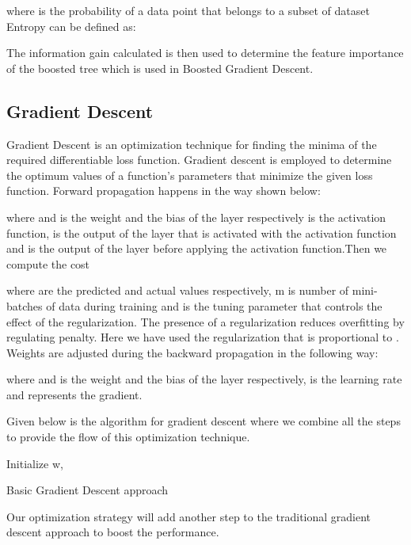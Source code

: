 \documentclass[review]{elsarticle}
\begin{document}
where  is the probability of a data point that belongs to a subset  of dataset 
Entropy can be defined as:

The information gain calculated is then used to determine the feature importance of the boosted tree which is used in Boosted Gradient Descent.



\subsection{Gradient Descent}
Gradient Descent is an optimization technique for finding the minima of the required differentiable loss function. Gradient descent is employed to determine the optimum values of a function's parameters that minimize the given loss function. Forward propagation happens in the way shown below:

where  and  is the weight and the bias of the  layer respectively  is the activation function,  is the output of the  layer that is activated with the activation function  and  is the output of the  layer before applying the activation function.Then we compute the cost 

where  are the predicted and actual values respectively, m is number of mini-batches of data during training and  is the tuning parameter that controls the effect of the regularization. The presence of a regularization reduces overfitting by regulating penalty. Here we have used the  regularization that is proportional to . Weights are adjusted during the backward propagation in the following way:

where  and  is the weight and the bias of the  layer respectively,  is the learning rate and  represents the gradient.

Given below is the algorithm for gradient descent where we combine all the steps to provide the flow of this optimization technique.
\begin{algorithm}[h!]
\SetAlgoLined
{}
 Initialize w, \;
 
 \caption{Basic Gradient Descent approach}
\end{algorithm}
Our optimization strategy will add another step to the traditional gradient descent approach to boost the performance.
\end{document}
